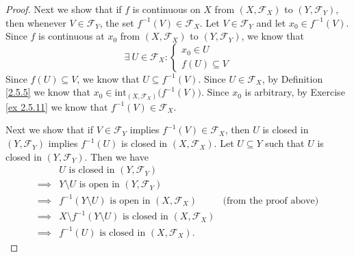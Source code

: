 \begin{proof}
    Next we show that if \(f\) is continuous on \(X\) from \((X, \mathcal{F}_X)\) to \((Y, \mathcal{F}_Y)\), then whenever \(V \in \mathcal{F}_Y\), the set \(f^{-1}(V) \in \mathcal{F}_X\).
    Let \(V \in \mathcal{F}_Y\) and let \(x_0 \in f^{-1}(V)\).
    Since \(f\) is continuous at \(x_0\) from \((X, \mathcal{F}_X)\) to \((Y, \mathcal{F}_Y)\), we know that
    \[
        \exists\ U \in \mathcal{F}_X : \begin{cases}
            x_0 \in U \\
            f(U) \subseteq V
        \end{cases}
    \]
    Since \(f(U) \subseteq V\), we know that \(U \subseteq f^{-1}(V)\).
    Since \(U \in \mathcal{F}_X\), by Definition \ref{2.5.5} we know that \(x_0 \in \text{int}_{(X, \mathcal{F}_X)}\big(f^{-1}(V)\big)\).
    Since \(x_0\) is arbitrary, by Exercise \ref{ex 2.5.11} we know that \(f^{-1}(V) \in \mathcal{F}_X\).

    Next we show that if \(V \in \mathcal{F}_Y\) implies \(f^{-1}(V) \in \mathcal{F}_X\), then \(U\) is closed in \((Y, \mathcal{F}_Y)\) implies \(f^{-1}(U)\) is closed in \((X, \mathcal{F}_X)\).
    Let \(U \subseteq Y\) such that \(U\) is closed in \((Y, \mathcal{F}_Y)\).
    Then we have
    \begin{align*}
                 & U \text{ is closed in } (Y, \mathcal{F}_Y)                                                                 \\
        \implies & Y \setminus U \text{ is open in } (Y, \mathcal{F}_Y)                                                       \\
        \implies & f^{-1}(Y \setminus U) \text{ is open in } (X, \mathcal{F}_X)               & \text{(from the proof above)} \\
        \implies & X \setminus f^{-1}(Y \setminus U) \text{ is closed in } (X, \mathcal{F}_X)                                 \\
        \implies & f^{-1}(U) \text{ is closed in } (X, \mathcal{F}_X).
    \end{align*}


\end{proof}
